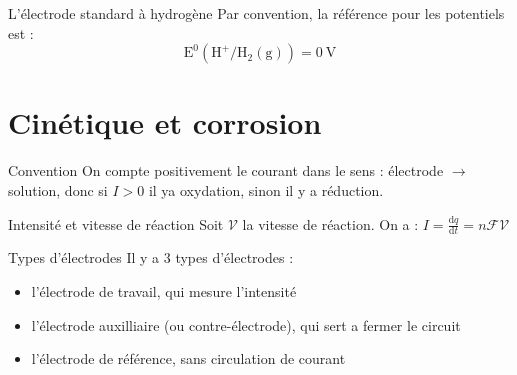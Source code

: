 \documentclass[french, a4paper, 11pt, twocolumn]{article}
\begin{document}
    \begin{cadre}{L'électrode standard à hydrogène}
        Par convention, la référence pour les potentiels est :
        \[\mathrm{E^0(H^+/H_2(g))=\SI{0}{\volt}}\]
    \end{cadre}

    \section{Cinétique et corrosion}
    \begin{cadre}{Convention}
        On compte positivement le courant dans le sens : électrode \(\rightarrow\) solution, donc si \(I>0\) il ya oxydation,
        sinon il y a réduction.
    \end{cadre}

    \begin{cadre}{Intensité et vitesse de réaction}
        Soit \(\mathcal{V}\) la vitesse de réaction.
        On a : \(I=\frac{\mathrm{d}q}{\mathrm{d}t}=n\mathcal{FV}\)
    \end{cadre}

    \begin{cadre}{Types d'électrodes}
        Il y a 3 types d'électrodes :
        \begin{itemize}
            \item l'électrode de travail, qui mesure l'intensité
            \item l'électrode auxilliaire (ou contre-électrode), qui sert a fermer le circuit
            \item l'électrode de référence, sans circulation de courant
        \end{itemize}
    \end{cadre}
\end{document}
